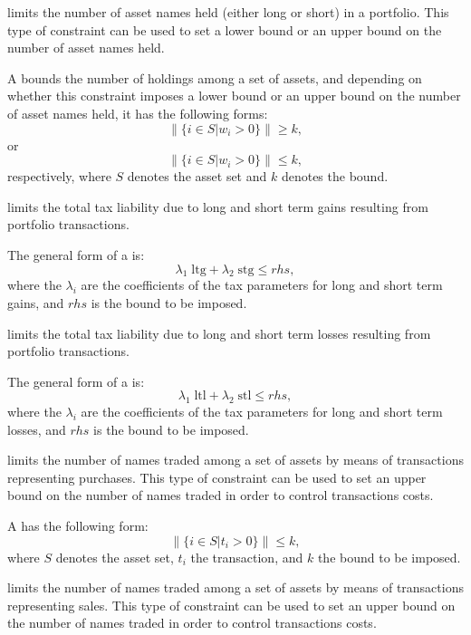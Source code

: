    limits the number of asset names held (either long or short) in a portfolio. 
   This type of constraint can be used to set a lower bound or an upper bound on the number of asset names held. 

   A  bounds the number of holdings among a set of assets, 
   and depending on whether this constraint imposes a lower bound or an upper bound on the number of asset names held, 
   it has the following forms: 
   \[
       \|\{i\in S|w_i>0\}\| \ge k,
   \]
   or
   \[
      \|\{i\in S|w_i>0\}\| \le k,
   \]
   respectively, where $S$ denotes the asset set and $k$ denotes the bound.

   limits the total tax liability due to long and short term gains resulting from portfolio transactions. 

   The general form of a  is: 
   \[
       \lambda_1\;\text{ltg} + \lambda_2\;\text{stg} \le rhs,
   \]
   where the $\lambda_i$ are the coefficients of the tax parameters for long and short term gains, and $rhs$ is the bound to be imposed. 
 

   limits the total tax liability due to long and short term losses resulting from portfolio transactions. 

   The general form of a  is: 
   \[
       \lambda_1\;\text{ltl} + \lambda_2\;\text{stl} \le rhs,
   \]
   where the $\lambda_i$ are the coefficients of the tax parameters for long and short term losses, and $rhs$ is the bound to be imposed. 
   
   limits the number of names traded among a set of assets by means of transactions representing purchases. 
   This type of constraint can be used to set an upper bound on the number of names traded in order to control transactions costs. 

   A  has the following form: 
   \[
        \|\{i\in S|t_i > 0\}\| \le k,
   \]
   where $S$ denotes the asset set, $t_i$ the transaction, and $k$ the bound to be imposed. 

   limits the number of names traded among a set of assets by means of transactions representing sales. 
   This type of constraint can be used to set an upper bound on the number of names traded in order to control transactions costs. 

